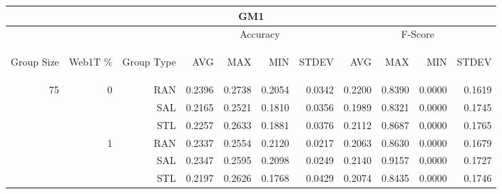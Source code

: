 \begin{center}
\begin{table}[htbp] 
 \begin{center}
\begin{tabular}{ | r | r | r | r | r | r | r | r | r | r | r |}
\hline
\multicolumn{11}{|c|}{GM1}\\
\hline
 & & & \multicolumn{4}{|c|}{Accuracy} & \multicolumn{4}{|c|}{F-Score}\\ \cline{4-11}
\begin{sideways}Group Size\end{sideways} & \begin{sideways}Web1T \%\end{sideways} & \begin{sideways}Group Type\end{sideways} & \begin{sideways}AVG\end{sideways} & \begin{sideways}MAX\end{sideways} & \begin{sideways}MIN\end{sideways} & \begin{sideways}STDEV\end{sideways} & \begin{sideways}AVG\end{sideways} & \begin{sideways}MAX\end{sideways} & \begin{sideways}MIN\end{sideways} & \begin{sideways}STDEV\end{sideways}\\
\hline
\multirow{18}{*}{75}
 & \multirow{3}{*}{0} & RAN & 0.2396 & 0.2738 & 0.2054 & 0.0342 & 0.2200 & 0.8390 & 0.0000 & 0.1619\\ \cline{3-11}
 &   & SAL & 0.2165 & 0.2521 & 0.1810 & 0.0356 & 0.1989 & 0.8321 & 0.0000 & 0.1745\\ \cline{3-11}
 &   & STL & 0.2257 & 0.2633 & 0.1881 & 0.0376 & 0.2112 & 0.8687 & 0.0000 & 0.1765\\ \cline{2-11}
 & \multirow{3}{*}{1} & RAN & 0.2337 & 0.2554 & 0.2120 & 0.0217 & 0.2063 & 0.8630 & 0.0000 & 0.1679\\ \cline{3-11}
 &   & SAL & 0.2347 & 0.2595 & 0.2098 & 0.0249 & 0.2140 & 0.9157 & 0.0000 & 0.1727\\ \cline{3-11}
 &   & STL & 0.2197 & 0.2626 & 0.1768 & 0.0429 & 0.2074 & 0.8435 & 0.0000 & 0.1746\\ \cline{2-11}

\end{tabular}
\end{center}
\end{table}
\end{center}
